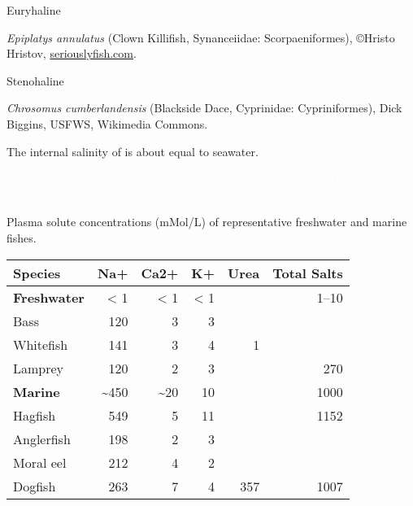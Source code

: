 \documentclass[t]{beamer}
\begin{document}
{
\begin{frame}[b,plain]{\textcolor{orange5}{Euryhaline} \textcolor{white}{fishes tolerate a wide range of salinity.}}

\hfill\tiny\textcolor{white!80!black}{\textit{Epiplatys annulatus} (Clown Killifish, Synanceiidae: Scorpaeniformes), \copyright Hristo Hristov, \url{seriouslyfish.com}.}
\end{frame}
}

{
\begin{frame}[b,plain]{\textcolor{orange5}{Stenohaline} \textcolor{white}{fishes tolerate a narrow range of salinity.}}

\hfill\tiny\textcolor{white!80!black}{\textit{Chrosomus cumberlandensis} (Blackside Dace, Cyprinidae: Cypriniformes), Dick Biggins, USFWS, Wikimedia Commons.}
\end{frame}
}

{
\begin{frame}[b,plain]{The internal salinity of  is about equal to seawater.}

\hfill\tiny\textcolor{white}{\textit{Eptatretus stouti}? (Pacific Hagfish, Myxinidae: Myxiniformes), NOAA Photo Library, Flickr Creative Commons.}
\end{frame}
}

\begin{frame}[c]{Plasma solute concentrations (mMol/L) of representative freshwater and marine fishes.}

\centering\begin{tabular}{lrrrrr}
\toprule
Species	&	Na+	&	Ca2+	&	K+	&	Urea	&	Total Salts \\
\midrule
\textbf{Freshwater}	&	< 1	&	< 1	&	< 1	&		&	1--10 \\
\hspace{1ex}Bass	&	120	&	3	&	3	&		&	 \\
\hspace{1ex}Whitefish	&	141	&	3	&	4	&	1	&	 \\
\hspace{1ex}Lamprey	&	120	&	2	&	3	&		&	270 \\
\textbf{Marine}	&	\textasciitilde450	&	\textasciitilde20	&	10	&		&	1000 \\
\hspace{1ex}Hagfish	&	549	&	5	&	11	&		&	1152 \\
\hspace{1ex}Anglerfish	&	198	&	2	&	3	&		&	 \\
\hspace{1ex}Moral eel	&	212	&	4	&	2	&		&	 \\
\hspace{1ex}Dogfish	&	263	&	7	&	4	&	357	&	1007 \\
\bottomrule
\end{tabular}

\end{frame}
\end{document}
